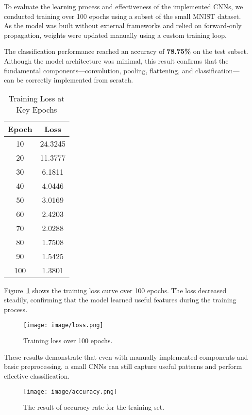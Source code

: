 \documentclass[conference]{IEEEtran}
\begin{document}
To evaluate the learning process and effectiveness of the implemented CNNs, we conducted training over 100 epochs using a subset of the small MNIST dataset. As the model was built without external frameworks and relied on forward-only propagation, weights were updated manually using a custom training loop.

The classification performance reached an accuracy of \textbf{78.75\%} on the test subset. Although the model architecture was minimal, this result confirms that the fundamental components—convolution, pooling, flattening, and classification—can be correctly implemented from scratch.

\begin{table}[h]
\centering
\caption{Training Loss at Key Epochs}
\label{tab:loss}
\begin{tabular}{|c|c|}
\hline
\textbf{Epoch} & \textbf{Loss} \\
\hline
10 & 24.3245 \\
20 & 11.3777 \\
30 & 6.1811 \\
40 & 4.0446 \\
50 & 3.0169 \\
60 & 2.4203 \\
70 & 2.0288 \\
80 & 1.7508 \\
90 & 1.5425 \\
100 & 1.3801 \\
\hline
\end{tabular}
\end{table}

Figure~\ref{fig:loss_curve} shows the training loss curve over 100 epochs. The loss decreased steadily, confirming that the model learned useful features during the training process.

\begin{figure}[!h]
\centering
\texttt{[image: image/loss.png]}
\caption{Training loss over 100 epochs.}
\label{fig:loss_curve}
\end{figure}

These results demonstrate that even with manually implemented components and basic preprocessing, a small CNNs can still capture useful patterns and perform effective classification.

\begin{figure}[!h]
\centering
\texttt{[image: image/accuracy.png]}
\caption{The result of accuracy rate for the training set.}
\label{fig:loss}
\end{figure}
\end{document}
